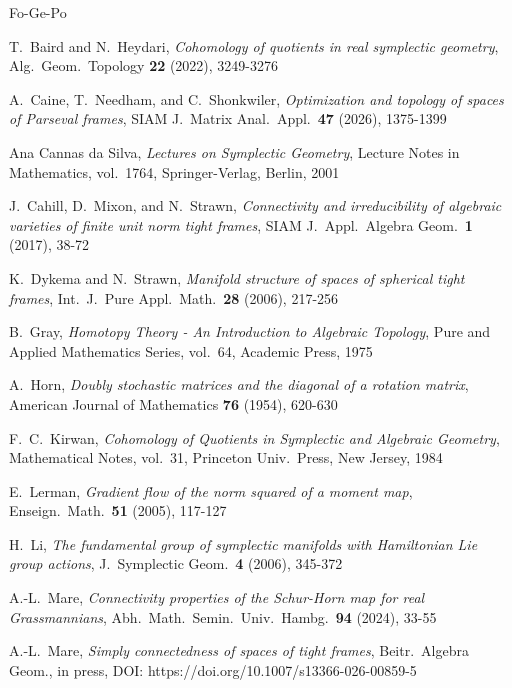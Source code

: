\documentclass[12pt]{amsart}
\theoremstyle{definition}
\theoremstyle{remark}
\begin{document}
\begin{thebibliography}{Fo-Ge-Po}

 T.~Baird and N.~Heydari, {\it Cohomology of quotients in real symplectic geometry}, Alg.~Geom.~Topology {\bf 22} (2022), 3249-3276


 A.~Caine, T.~Needham, and C.~Shonkwiler, {\it Optimization and topology of spaces of Parseval frames}, SIAM J.~Matrix Anal.~Appl.~{\bf 47} (2026), 1375-1399

 Ana Cannas da Silva, {\it Lectures on Symplectic Geometry}, Lecture Notes in Mathematics, vol.~1764, Springer-Verlag, Berlin, 2001



 J.~Cahill, D.~Mixon, and N.~Strawn, {\it Connectivity and irreducibility of algebraic varieties of finite unit norm tight frames}, SIAM J.~Appl.~Algebra Geom.~{\bf 1} (2017), 38-72

 K.~Dykema and N.~Strawn, {\it Manifold structure of spaces of spherical tight frames}, Int.~J.~Pure Appl.~Math.~{\bf 28} (2006), 
 217-256
 
 B.~Gray, {\it Homotopy Theory - An Introduction to Algebraic Topology}, Pure and Applied Mathematics Series, vol.~64, Academic Press, 1975


 A.~Horn, {\it Doubly stochastic matrices and the diagonal of a rotation matrix}, American Journal of Mathematics {\bf 76} (1954), 620-630

 F.~C.~Kirwan, {\it Cohomology of Quotients in Symplectic and Algebraic Geometry}, Mathematical
Notes, vol.~31, Princeton Univ.~Press, New Jersey, 1984

 E.~Lerman, {\it Gradient flow of the norm squared of a moment map}, Enseign.~Math.~{\bf 51} (2005), 117-127

 H.~Li, {\it The fundamental group of symplectic manifolds with Hamiltonian Lie group actions}, J.~Symplectic Geom.~{\bf 4} (2006), 345-372 



 A.-L.~Mare, {\it Connectivity properties of the Schur-Horn map for real Grassmannians}, Abh.~Math.~Semin.~Univ.~Hambg.~{\bf 94} (2024), 33-55

 A.-L.~Mare, {\it Simply connectedness of spaces of tight frames}, Beitr.~Algebra Geom., in press,
DOI: https://doi.org/10.1007/s13366-026-00859-5


\end{thebibliography}
\end{document}
